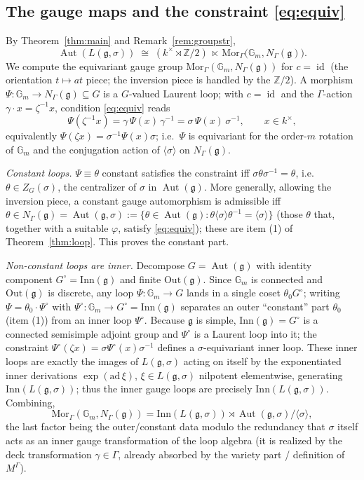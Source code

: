 \documentclass{amsart}
\theoremstyle{definition}
\DeclareMathOperator{\Aut}{Aut}
\DeclareMathOperator{\id}{id}
\newcommand{\Gm}{\mathbb{G}_m}
\newcommand{\g}{\mathfrak{g}}
\newcommand{\Z}{\mathbb{Z}}
\newcommand{\M}{M}
\begin{document}
\subsection{The gauge maps and the constraint \eqref{eq:equiv}}
By Theorem~\ref{thm:main} and Remark~\ref{rem:groupstr},
\[
\Aut(L(\g,\sigma))\;\cong\;
(k^\times\rtimes\Z/2)\ \ltimes\
\mathrm{Mor}_\Gamma\bigl(\Gm,N_\Gamma(\g)\bigr).
\]
We compute the equivariant gauge group
$\mathrm{Mor}_\Gamma(\Gm,N_\Gamma(\g))$ for $c=\id$ (the orientation
$t\mapsto at$ piece; the inversion piece is handled by the $\Z/2$).  A
morphism $\Psi\colon\Gm\to N_\Gamma(\g)\subseteq G$ is a
$G$-valued Laurent loop; with $c=\id$ and the $\Gamma$-action
$\gamma\cdot x=\zeta^{-1}x$, condition \eqref{eq:equiv} reads
\[
\Psi(\zeta^{-1} x)=\gamma\,\Psi(x)\,\gamma^{-1}=\sigma\,\Psi(x)\,\sigma^{-1},
\qquad x\in k^\times,
\]
equivalently $\Psi(\zeta x)=\sigma^{-1}\Psi(x)\sigma$; i.e.\ $\Psi$ is
equivariant for the order-$m$ rotation of $\Gm$ and the conjugation action
of $\langle\sigma\rangle$ on $N_\Gamma(\g)$.

\emph{Constant loops.}  $\Psi\equiv\theta$ constant satisfies the
constraint iff $\sigma\theta\sigma^{-1}=\theta$, i.e.\
$\theta\in Z_{G}(\sigma)$, the centralizer of $\sigma$ in $\Aut(\g)$.  More
generally, allowing the inversion piece, a constant gauge automorphism is
admissible iff $\theta\in N_\Gamma(\g)=\Aut(\g,\sigma):=
\{\theta\in\Aut(\g):\theta\langle\sigma\rangle\theta^{-1}=
\langle\sigma\rangle\}$ (those $\theta$ that, together with a suitable
$\varphi$, satisfy \eqref{eq:equiv}); these are item (1) of
Theorem~\ref{thm:loop}.  This proves the constant part.

\emph{Non-constant loops are inner.}  Decompose $G=\Aut(\g)$ with identity
component $G^\circ=\mathrm{Inn}(\g)$ and finite $\mathrm{Out}(\g)$.  Since
$\Gm$ is connected and $\mathrm{Out}(\g)$ is discrete, any loop
$\Psi\colon\Gm\to G$ lands in a single coset $\theta_0 G^\circ$; writing
$\Psi=\theta_0\cdot\Psi^\circ$ with $\Psi^\circ\colon\Gm\to G^\circ=
\mathrm{Inn}(\g)$ separates an outer ``constant'' part $\theta_0$ (item
(1)) from an inner loop $\Psi^\circ$.  Because $\g$ is simple,
$\mathrm{Inn}(\g)=G^\circ$ is a connected semisimple adjoint group and
$\Psi^\circ$ is a Laurent loop into it; the constraint
$\Psi^\circ(\zeta x)=\sigma\Psi^\circ(x)\sigma^{-1}$ defines a
$\sigma$-equivariant inner loop.  These inner loops are exactly the
images of $L(\g,\sigma)$ acting on itself by the exponentiated inner
derivations $\exp(\mathrm{ad}\,\xi)$, $\xi\in L(\g,\sigma)$ nilpotent
elementwise, generating $\mathrm{Inn}(L(\g,\sigma))$; thus the inner gauge
loops are precisely $\mathrm{Inn}(L(\g,\sigma))$.  Combining,
\[
\mathrm{Mor}_\Gamma(\Gm,N_\Gamma(\g))=
\mathrm{Inn}(L(\g,\sigma))\rtimes \Aut(\g,\sigma)/\!\langle\sigma\rangle,
\]
the last factor being the outer/constant data modulo the redundancy that
$\sigma$ itself acts as an inner gauge transformation of the loop algebra
(it is realized by the deck transformation $\gamma\in\Gamma$, already
absorbed by the variety part / definition of $\M^\Gamma$).
\end{document}
